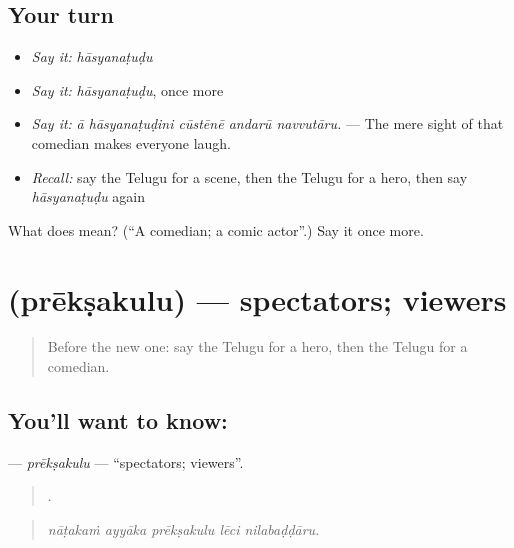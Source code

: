 \subsection*{Your turn}
\begin{itemize}
\raggedright
  \item \emph{Say it:} \emph{hāsyanaṭuḍu}
  \item \emph{Say it:} \emph{hāsyanaṭuḍu}, once more
  \item \emph{Say it:} \emph{ā hāsyanaṭuḍini cūstēnē andarū navvutāru.} — The mere sight of that comedian makes everyone laugh.
  \item \emph{Recall:} say the Telugu for a scene, then the Telugu for a hero, then say \emph{hāsyanaṭuḍu} again
\end{itemize}

\begin{tcolorbox}[breakable,colback=teal!4,colframe=teal!35!black,title={Before you move on}]
What does  mean? (\textquotedblleft{}A comedian; a comic actor\textquotedblright{}.) Say it once more.
\end{tcolorbox}
\section[\texorpdfstring{\te{ప్రేక్షకులు} (prēkṣakulu)}{ప్రేక్షకులు (prēkṣakulu)}]{ (prēkṣakulu) — spectators; viewers}

\label{lesson:TE-C541-preksakulu}



\begin{quote}
Before the new one: say the Telugu for a hero, then the Telugu for a comedian.
\end{quote}

\subsection*{You'll want to know: }
\textbf{} — \emph{prēkṣakulu} — \textquotedblleft{}spectators; viewers\textquotedblright{}.

\begin{quote}
    .
\end{quote}

\begin{quote}
\emph{nāṭakaṁ ayyāka prēkṣakulu lēci nilabaḍḍāru.}
\end{quote}

